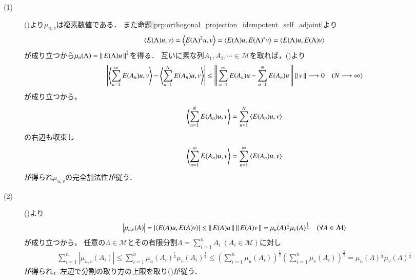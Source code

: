	\begin{prf}\mbox{}
		\begin{description}
			\item[(1)] ()より$\mu_{u,v}$は複素数値である．
				また命題\ref{prp:orthogonal_projection_idempotent_self_adjoint}より
				\begin{align}
					\inprod<E(\Lambda)u,v> = \inprod<E(\Lambda)^2u,v> = \inprod<E(\Lambda)u,E(\Lambda)^*v> = \inprod<E(\Lambda)u,E(\Lambda)v>
					\label{eq:lem_complex_measure_introduced_by_spectral_measure_2}
				\end{align}
				が成り立つから$\mu_u(\Lambda) = \left\|\, E(\Lambda)u\, \right\|_{}^2$を得る．
				互いに素な列$A_1,A_2,\cdots \in \mathcal{M}$を取れば，()より
				\begin{align}
					\left| \inprod<\sum_{n=1}^{\infty}E(A_n)u,v> - \inprod<\sum_{n=1}^{N}E(A_n)u,v> \right|
					\leq \Norm{\sum_{n=1}^{\infty}E(A_n)u - \sum_{n=1}^{N}E(A_n)u}{} \Norm{v}{}
					\longrightarrow 0 \quad (N \longrightarrow \infty)
				\end{align}
				が成り立つから，
				\begin{align}
					\inprod<\sum_{n=1}^{N}E(A_n)u,v>= \sum_{n=1}^{N} \inprod<E(A_n)u,v> 
				\end{align}
				の右辺も収束し
				\begin{align}
					\inprod<\sum_{n=1}^{\infty}E(A_n)u,v> = \sum_{n=1}^{\infty}\inprod<E(A_n)u,v>
				\end{align}
				が得られ$\mu_{u,v}$の完全加法性が従う．
				
			\item[(2)] 
				()より
				\begin{align}
					\left| \mu_{u,v}(A) \right| = \left| \inprod<E(A)u,E(A)v> \right|
					\leq \Norm{E(A)u}{}\Norm{E(A)v}{}
					= \mu_u(A)^{\frac{1}{2}} \mu_v(A)^{\frac{1}{2}} \quad (\forall A \in \mathcal{M})
				\end{align}
				が成り立つから，
				任意の$\Lambda \in \mathcal{M}$とその有限分割$\Lambda = \sum_{i=1}^{n} A_i\ (A_i \in \mathcal{M})$に対し
				\begin{align}
					\sum_{i=1}^{n} \left| \mu_{u,v}(A_i) \right|
					\leq \sum_{i=1}^{n} \mu_u(A_i)^{\frac{1}{2}} \mu_v(A_i)^{\frac{1}{2}}
					\leq \left( \sum_{i=1}^{n} \mu_u(A_i) \right)^{\frac{1}{2}} \left( \sum_{i=1}^{n} \mu_v(A_i) \right)^{\frac{1}{2}}
					= \mu_u(\Lambda)^{\frac{1}{2}} \mu_v(\Lambda)^{\frac{1}{2}}
				\end{align}
				が得られ，左辺で分割の取り方の上限を取り()が従う．
			

\end{description}
\end{prf}
